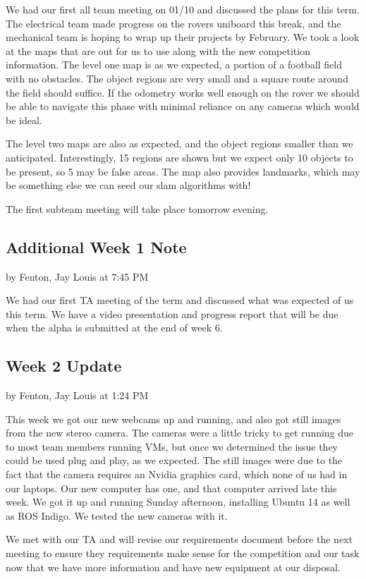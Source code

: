 \documentclass[10pt, oneside,onecolumn]{IEEEtran}
\begin{document}
\begin{titlepage}
We had our first all team meeting on 01/10 and discussed the plans for this term. The electrical team made progress on the rovers uniboard this break, and the mechanical team is hoping to wrap up their projects by February. We took a look at the maps that are out for us to use along with the new competition information. The level one map is as we expected, a portion of a football field with no obstacles. The object regions are very small and a square route around the field should suffice. If the odometry works well enough on the rover we should be able to navigate this phase with minimal reliance on any cameras which would be ideal.

The level two maps are also as expected, and the object regions smaller than we anticipated. Interestingly, 15 regions are shown but we expect only 10 objects to be present, so 5 may be false areas. The map also provides landmarks, which may be something else we can seed our slam algorithms with!

The first subteam meeting will take place tomorrow evening.

\subsection{Additional Week 1 Note}
by Fenton, Jay Louis at 7:45 PM

We had our first TA meeting of the term and discussed what was expected of us this term. We have a video presentation and progress report that will be due when the alpha is submitted at the end of week 6. 

\subsection{Week 2 Update}
by Fenton, Jay Louis at 1:24 PM

This week we got our new webcams up and running, and also got still images from the new stereo camera. The cameras were a little tricky to get running due to most team members running VMs, but once we determined the issue they could be used plug and play, as we expected. The still images were due to the fact that the camera requires an Nvidia graphics card, which none of us had in our laptops. Our new computer has one, and that computer arrived late this week. We got it up and running Sunday afternoon, installing Ubuntu 14 as well as ROS Indigo. We tested the new cameras with it. 

We met with our TA and will revise our requirements document before the next meeting to ensure they requirements make sense for the competition and our task now that we have more information and have new equipment at our disposal. 



\end{titlepage}
\end{document}
